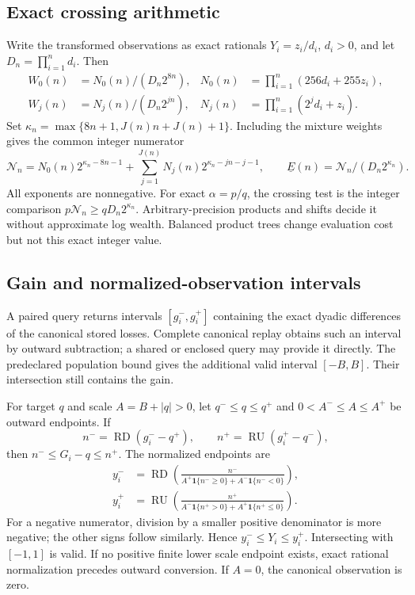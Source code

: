 \documentclass[11pt]{article}
\begin{document}
\subsection{Exact crossing arithmetic}
Write the transformed observations as exact rationals $Y_i=z_i/d_i$, $d_i>0$, and let $D_n=\prod_{i=1}^nd_i$. Then
\begin{align}
 W_0(n)&=N_0(n)/(D_n2^{8n}),& N_0(n)&=\prod_{i=1}^n(256d_i+255z_i),\\
 W_j(n)&=N_j(n)/(D_n2^{jn}),& N_j(n)&=\prod_{i=1}^n(2^jd_i+z_i).
\end{align}
Set $\kappa_n=\max\{8n+1,J(n)n+J(n)+1\}$. Including the mixture weights gives the common integer numerator
\begin{equation}
 \mathcal N_n=N_0(n)2^{\kappa_n-8n-1}+\sum_{j=1}^{J(n)}N_j(n)2^{\kappa_n-jn-j-1},\qquad
 \underline E(n)=\mathcal N_n/(D_n2^{\kappa_n}).
\end{equation}
All exponents are nonnegative. For exact $\alpha=p/q$, the crossing test is the integer comparison $p\mathcal N_n\ge qD_n2^{\kappa_n}$. Arbitrary-precision products and shifts decide it without approximate log wealth. Balanced product trees change evaluation cost but not this exact integer value.


\subsection{Gain and normalized-observation intervals}
A paired query returns intervals $[g_i^-,g_i^+]$ containing the exact dyadic differences of the canonical stored losses. Complete canonical replay obtains such an interval by outward subtraction; a shared or enclosed query may provide it directly. The predeclared population bound gives the additional valid interval $[-B,B]$. Their intersection still contains the gain.

For target $q$ and scale $A=B+|q|>0$, let $q^-\le q\le q^+$ and $0<A^-\le A\le A^+$ be outward endpoints. If
\begin{equation}
n^-=\operatorname{RD}(g_i^--q^+),\qquad n^+=\operatorname{RU}(g_i^+-q^-),
\end{equation}
then $n^-\le G_i-q\le n^+$. The normalized endpoints are
\begin{align}
y_i^-&=\operatorname{RD}\!\left(\frac{n^-}{A^+\mathbf1\{n^-\ge0\}+A^-\mathbf1\{n^-<0\}}\right),\nonumber\\
y_i^+&=\operatorname{RU}\!\left(\frac{n^+}{A^-\mathbf1\{n^+>0\}+A^+\mathbf1\{n^+\le0\}}\right).
\label{eq:normalization-interval}
\end{align}
For a negative numerator, division by a smaller positive denominator is more negative; the other signs follow similarly. Hence $y_i^-\le Y_i\le y_i^+$. Intersecting with $[-1,1]$ is valid. If no positive finite lower scale endpoint exists, exact rational normalization precedes outward conversion. If $A=0$, the canonical observation is zero.
\end{document}
